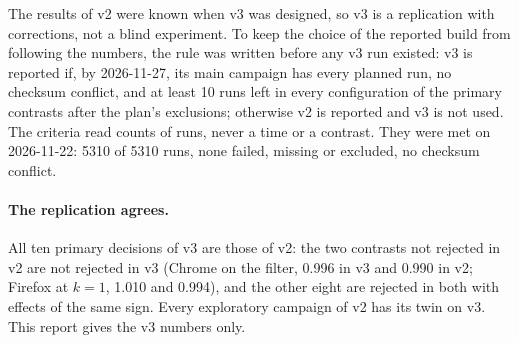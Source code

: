 The results of v2 were known when v3 was designed, so v3 is a replication
with corrections, not a blind experiment. To keep the choice of the reported
build from following the numbers, the rule was written before any v3 run
existed: v3 is reported if, by 2026-11-27, its main campaign has every
planned run, no checksum conflict, and at least 10 runs left in every
configuration of the primary contrasts after the plan's exclusions;
otherwise v2 is reported and v3 is not used. The criteria read counts of
runs, never a time or a contrast. They were met on 2026-11-22: 5310 of 5310
runs, none failed, missing or excluded, no checksum conflict.

\paragraph{The replication agrees.} All ten primary decisions of v3 are
those of v2: the two contrasts not rejected in v2 are not rejected in v3
(Chrome on the filter, 0.996 in v3 and 0.990 in v2; Firefox at $k=1$, 1.010
and 0.994), and the other eight are rejected in both with effects of the
same sign. Every exploratory campaign of v2 has its twin on v3. This report
gives the v3 numbers only.

